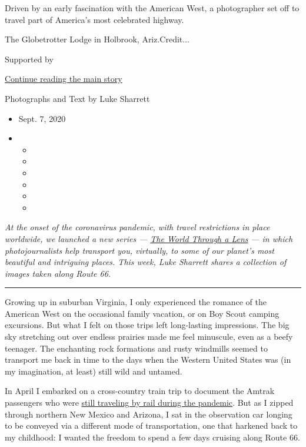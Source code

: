 Driven by an early fascination with the American West, a photographer
set off to travel part of America's most celebrated highway.

The Globetrotter Lodge in Holbrook, Ariz.Credit...

Supported by

\protect\hyperlink{after-sponsor}{Continue reading the main story}

Photographs and Text by Luke Sharrett

\begin{itemize}
\item
  Sept. 7, 2020
\item
  \begin{itemize}
  \item
  \item
  \item
  \item
  \item
  \item
  \end{itemize}
\end{itemize}

\emph{At the onset of the coronavirus pandemic, with travel restrictions
in place worldwide, we launched a new series ---}
\href{https://www.nytimes3xbfgragh.onion/column/the-world-through-a-lens}{\emph{The
World Through a Lens}} \emph{--- in which photojournalists help
transport you, virtually, to some of our planet's most beautiful and
intriguing places. This week, Luke Sharrett shares a collection of
images taken along Route 66.}

\begin{center}\rule{0.5\linewidth}{\linethickness}\end{center}

Growing up in suburban Virginia, I only experienced the romance of the
American West on the occasional family vacation, or on Boy Scout camping
excursions. But what I felt on those trips left long-lasting
impressions. The big sky stretching out over endless prairies made me
feel minuscule, even as a beefy teenager. The enchanting rock formations
and rusty windmills seemed to transport me back in time to the days when
the Western United States was (in my imagination, at least) still wild
and untamed.

In April I embarked on a cross-country train trip to document the Amtrak
passengers who were
\href{https://www.nytimes3xbfgragh.onion/2020/05/06/opinion/amtrak-trains-coronavirus.html}{still
traveling by rail during the pandemic}. But as I zipped through northern
New Mexico and Arizona, I sat in the observation car longing to be
conveyed via a different mode of transportation, one that harkened back
to my childhood: I wanted the freedom to spend a few days cruising along
Route 66.

